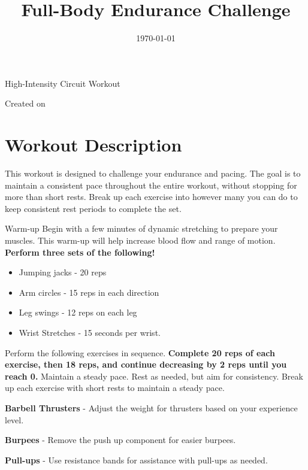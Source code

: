 \documentclass{article}
\newcounter{workout}
\newcounter{exercise}
\renewcommand{\maketitle}{
	\begin{center}
		{\color{blue!70}\Huge\bfseries\thetitle}
		
		\vspace{0.5em}
		
		High-Intensity Circuit Workout
		
		\vspace{0.5em}
		
		Created on \thedate
	\end{center}
}
\begin{document}
	
	\title{Full-Body Endurance Challenge}
	\date{\today}
	\maketitle
	
	\section{Workout Description}
	This workout is designed to challenge your endurance and pacing. The goal is to maintain a consistent pace throughout the entire workout, without stopping for more than short rests. Break up each exercise into however many you can do to keep consistent rest periods to complete the set. 
	
	\begin{workoutbox}{Warm-up}
		Begin with a few minutes of dynamic stretching to prepare your muscles. This warm-up will help increase blood flow and range of motion. \textbf{Perform three sets of the following!}
		
		\begin{itemize}[label=\textcolor{blue!70}{\textbullet}, itemsep=0pt]
			\item Jumping jacks - 20 reps
			\item Arm circles - 15 reps in each direction
			\item Leg swings - 12 reps on each leg
			\item Wrist Stretches - 15 seconds per wrist.
		\end{itemize}
	\end{workoutbox}
	
	Perform the following exercises in sequence. \textbf{Complete 20 reps of each exercise, then 18 reps, and continue decreasing by 2 reps until you reach 0.} Maintain a steady pace. Rest as needed, but aim for consistency. Break up each exercise with short rests to maintain a steady pace.
	
	\begin{exercisebox}
		\textbf{Barbell Thrusters} - Adjust the weight for thrusters based on your experience level.
	\end{exercisebox}
	
	\begin{exercisebox}
		\textbf{Burpees} - Remove the push up component for easier burpees.
	\end{exercisebox}
	
	\begin{exercisebox}
		\textbf{Pull-ups} - Use resistance bands for assistance with pull-ups as needed. 
	\end{exercisebox}
	
\end{document}
